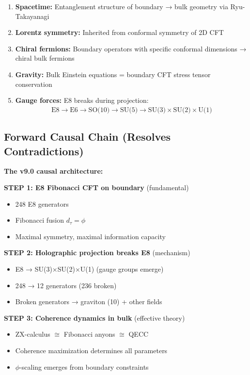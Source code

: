 \documentclass[11pt]{article}
\theoremstyle{definition}
\newcommand{\goldenratio}{\phi}
\begin{document}
\begin{enumerate}
\item \textbf{Spacetime:} Entanglement structure of boundary → bulk geometry via Ryu-Takayanagi
\item \textbf{Lorentz symmetry:} Inherited from conformal symmetry of 2D CFT
\item \textbf{Chiral fermions:} Boundary operators with specific conformal dimensions → chiral bulk fermions
\item \textbf{Gravity:} Bulk Einstein equations = boundary CFT stress tensor conservation
\item \textbf{Gauge forces:} E8 breaks during projection:
\begin{align}
\text{E8} \rightarrow \text{E6} \rightarrow \text{SO(10)} \rightarrow \text{SU(5)} \rightarrow \text{SU(3)} \times \text{SU(2)} \times \text{U(1)}
\end{align}
\end{enumerate}

\subsection{Forward Causal Chain (Resolves Contradictions)}

\textbf{The v9.0 causal architecture:}

\textbf{STEP 1: E8 Fibonacci CFT on boundary} (fundamental)
\begin{itemize}
\item 248 E8 generators
\item Fibonacci fusion $d_\tau = \goldenratio$
\item Maximal symmetry, maximal information capacity
\end{itemize}

\textbf{STEP 2: Holographic projection breaks E8} (mechanism)
\begin{itemize}
\item E8 → SU(3)×SU(2)×U(1) (gauge groups emerge)
\item 248 → 12 generators (236 broken)
\item Broken generators → graviton (10) + other fields
\end{itemize}

\textbf{STEP 3: Coherence dynamics in bulk} (effective theory)
\begin{itemize}
\item ZX-calculus $\cong$ Fibonacci anyons $\cong$ QECC
\item Coherence maximization determines all parameters
\item $\goldenratio$-scaling emerges from boundary constraints
\end{itemize}
\end{document}
